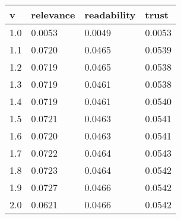 \documentclass[11pt]{article}
\begin{document}
\begin{table}[]
\begin{tabular}{|l|l|l|l|} \hline
v   & relevance & readability & trust  \\ \hline
1.0 & 0.0053    & 0.0049     & 0.0053 \\ \hline
1.1 & 0.0720    & 0.0465     & 0.0539 \\\hline
1.2 & 0.0719    & 0.0465     & 0.0538 \\\hline
1.3 & 0.0719    & 0.0461     & 0.0538 \\\hline
1.4  & 0.0719    & 0.0461     & 0.0540 \\\hline
1.5 & 0.0721    & 0.0463     & 0.0541 \\\hline
1.6 & 0.0720    & 0.0463     & 0.0541 \\\hline
1.7 & 0.0722    & 0.0464     & 0.0543 \\\hline
1.8 & 0.0723    & 0.0464     & 0.0542 \\\hline
1.9 & 0.0727    & 0.0466     & 0.0542 \\\hline
2.0 & 0.0621    & 0.0466     & 0.0542 \\ \hline
\end{tabular}
\caption{}
\label{tab:vary-k}
\end{table}
\end{document}
